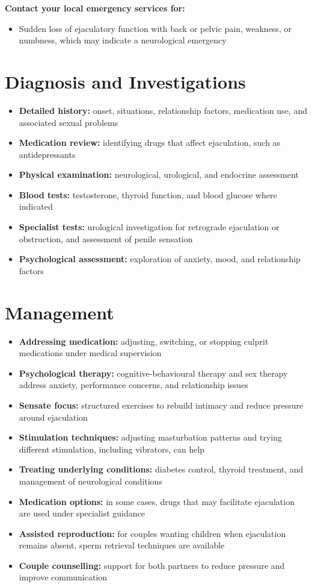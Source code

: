 \textbf{Contact your local emergency services for:}
\begin{itemize}
    \item Sudden loss of ejaculatory function with back or pelvic pain, weakness, or numbness, which may indicate a neurological emergency
\end{itemize}

\section*{Diagnosis and Investigations}
\begin{itemize}
    \item \textbf{Detailed history:} onset, situations, relationship factors, medication use, and associated sexual problems
    \item \textbf{Medication review:} identifying drugs that affect ejaculation, such as antidepressants
    \item \textbf{Physical examination:} neurological, urological, and endocrine assessment
    \item \textbf{Blood tests:} testosterone, thyroid function, and blood glucose where indicated
    \item \textbf{Specialist tests:} urological investigation for retrograde ejaculation or obstruction, and assessment of penile sensation
    \item \textbf{Psychological assessment:} exploration of anxiety, mood, and relationship factors
\end{itemize}

\section*{Management}
\begin{itemize}
    \item \textbf{Addressing medication:} adjusting, switching, or stopping culprit medications under medical supervision
    \item \textbf{Psychological therapy:} cognitive-behavioural therapy and sex therapy address anxiety, performance concerns, and relationship issues
    \item \textbf{Sensate focus:} structured exercises to rebuild intimacy and reduce pressure around ejaculation
    \item \textbf{Stimulation techniques:} adjusting masturbation patterns and trying different stimulation, including vibrators, can help
    \item \textbf{Treating underlying conditions:} diabetes control, thyroid treatment, and management of neurological conditions
    \item \textbf{Medication options:} in some cases, drugs that may facilitate ejaculation are used under specialist guidance
    \item \textbf{Assisted reproduction:} for couples wanting children when ejaculation remains absent, sperm retrieval techniques are available
    \item \textbf{Couple counselling:} support for both partners to reduce pressure and improve communication
\end{itemize}

